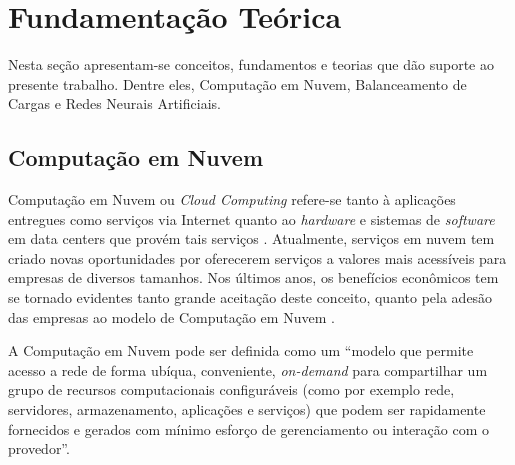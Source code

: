 \chapter{Fundamentação Teórica}\label{cap:fundamentacao-teorica}
Nesta seção apresentam-se conceitos, fundamentos e teorias que dão suporte ao presente trabalho. Dentre eles, Computação em Nuvem, Balanceamento de Cargas e Redes Neurais Artificiais.
\section{Computação em Nuvem}\label{sec:cloud-comp}
Computação em Nuvem ou \textit{Cloud Computing} refere-se tanto à aplicações entregues como serviços via Internet quanto ao \textit{hardware} e sistemas de \textit{software} em data centers que provém tais serviços \cite{Armbrust:2010}. Atualmente, serviços em nuvem tem criado novas oportunidades por oferecerem serviços a valores mais acessíveis para empresas de diversos tamanhos. Nos últimos anos, os benefícios econômicos tem se tornado evidentes tanto grande aceitação deste conceito, quanto pela adesão das empresas ao modelo de Computação em Nuvem \cite{raza2015}.

A Computação em Nuvem pode ser definida como um “modelo que permite acesso a rede de forma ubíqua, conveniente, \textit{on-demand} para compartilhar um grupo de recursos computacionais configuráveis (como por exemplo rede, servidores, armazenamento, aplicações e serviços) que podem ser rapidamente fornecidos e gerados com mínimo esforço de gerenciamento ou interação com o provedor”\cite{mell2011nist}. 

